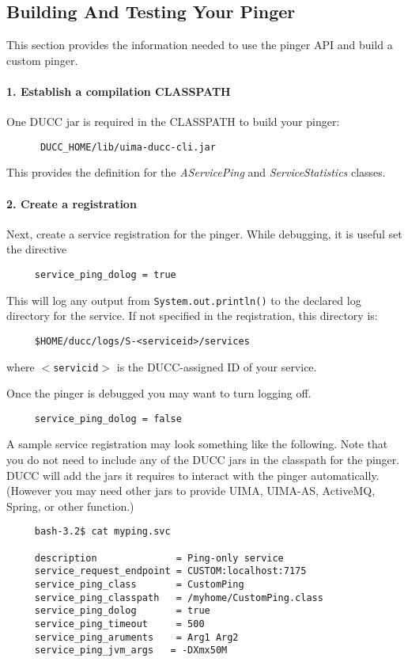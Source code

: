       \subsection{Building And Testing Your Pinger}
      This section provides the information needed to use the pinger API and build a
      custom pinger. 

      \paragraph{1. Establish a compilation CLASSPATH} One DUCC jar is required in the CLASSPATH to build your pinger:
\begin{verbatim}
      DUCC_HOME/lib/uima-ducc-cli.jar
\end{verbatim}      
      This provides the definition for the {\em AServicePing} and {\em ServiceStatistics} classes.

      \paragraph{2. Create a registration}Next, create a service registration for the pinger.  While
      debugging, it is useful set the directive
\begin{verbatim}
     service_ping_dolog = true
\end{verbatim}
      This will log any output from  {\tt System.out.println()} to the declared log directory
      for the service.  If not specified in the reqistration, this directory is:
\begin{verbatim}
     $HOME/ducc/logs/S-<serviceid>/services
\end{verbatim}
      where {\tt$<$servicid$>$} is the DUCC-assigned ID of your service.

      Once the pinger is debugged you may want to turn logging off.
\begin{verbatim}
     service_ping_dolog = false
\end{verbatim}
      
      A sample service registration may look something like the following.  Note that you do not need
      to include any of the DUCC jars in the classpath for the pinger.  DUCC will add the jars it
      requires to interact with the pinger automatically.  (However you may need other jars to
      provide UIMA, UIMA-AS, ActiveMQ, Spring, or other function.)
\begin{verbatim}
     bash-3.2$ cat myping.svc

     description              = Ping-only service
     service_request_endpoint = CUSTOM:localhost:7175
     service_ping_class       = CustomPing
     service_ping_classpath   = /myhome/CustomPing.class
     service_ping_dolog       = true
     service_ping_timeout     = 500
     service_ping_aruments    = Arg1 Arg2
     service_ping_jvm_args   = -DXmx50M
\end{verbatim}
       
